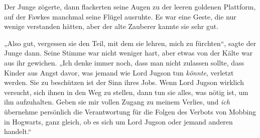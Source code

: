 Der Junge zögerte, dann flackerten seine Augen zu der leeren goldenen Plattform, auf der Fawkes manchmal seine Flügel ausruhte. Es war eine Geste, die nur wenige verstanden hätten, aber der alte Zauberer kannte sie sehr gut.

„Also gut, vergessen sie den Teil, mit dem sie lehren, mich zu fürchten“, sagte der Junge dann. Seine Stimme war nicht weniger hart, aber etwas von der Kälte war aus ihr gewichen.
„Ich denke immer noch, dass man nicht zulassen sollte, dass Kinder aus Angst davor, was jemand wie Lord Jugson tun \emph{könnte}, verletzt werden. Sie zu beschützen ist der Sinn ihres Jobs. Wenn Lord Jugson wirklich versucht, sich ihnen in den Weg zu stellen, dann tun sie alles, was nötig ist, um ihn aufzuhalten. Geben sie mir vollen Zugang zu meinem Verlies, und \emph{ich} übernehme persönlich die Verantwortung für die Folgen des Verbots von Mobbing in Hogwarts, ganz gleich, ob es sich um Lord Jugson oder jemand anderen handelt.“

